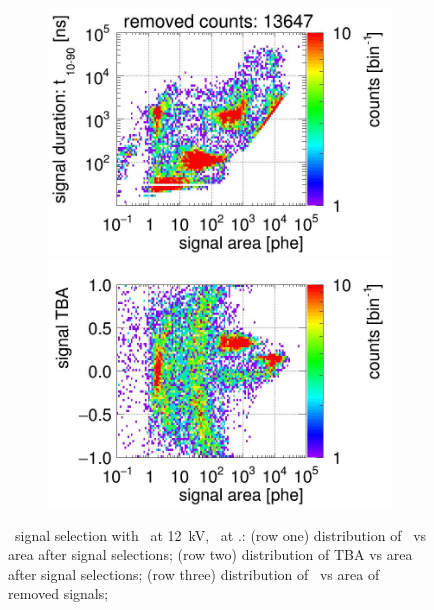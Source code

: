 \begin{landscape}
\begin{figure}[!p]
\begin{subfigure}[t]{0.33\textwidth}
			\includegraphics[width=\figurewidth,clip,trim={0 98 0 10}]{Figures/GasTest/CutsValid/res64767/pdpaX29Vecfig64767.jpg}
			\includegraphics[width=\figurewidth,clip,trim={0 0 0 40}]{Figures/GasTest/CutsValid/res64767/tbapaX29Vecfig64767.jpg}
			\caption{}
			\label{fig:signal selection dv 12 04}
		\end{subfigure}
		\caption[\gtest\ signal selection with \opdv\ at \SI{12}{\kV}, \opgd\ at \standarddensity .]{\gtest\ signal selection with \opdv\ at \SI{12}{\kV}, \opgd\ at \standarddensity .: 
			(row one) distribution of \rpdshort\ vs area after signal selections;
(row two) distribution of TBA vs area after signal selections;
(row three) distribution of \rpdshort\ vs area of removed signals;
}
\end{figure}
\end{landscape}
